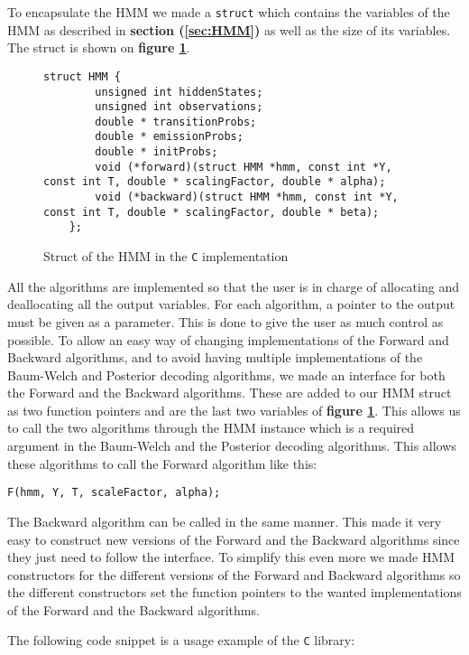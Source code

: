 To encapsulate the HMM we made a \texttt{struct} which contains the variables of the HMM as described in \textbf{section (\ref{sec:HMM})} as well as the size of its variables. The struct is shown on \textbf{figure \ref{fig:hmmstruct}}.
\begin{figure}[H]
    \centering
    \begin{lstlisting}[style=CStyle]
    struct HMM {
        unsigned int hiddenStates;
        unsigned int observations;
        double * transitionProbs;
        double * emissionProbs;
        double * initProbs;
        void (*forward)(struct HMM *hmm, const int *Y, const int T, double * scalingFactor, double * alpha);
        void (*backward)(struct HMM *hmm, const int *Y, const int T, double * scalingFactor, double * beta);
    };\end{lstlisting}
    \caption{Struct of the HMM in the \texttt{C} implementation}
    \label{fig:hmmstruct}
\end{figure}
All the algorithms are implemented so that the user is in charge of allocating and deallocating all the output variables. For each algorithm, a pointer to the output must be given as a parameter. This is done to give the user as much control as possible.
To allow an easy way of changing implementations of the Forward and Backward algorithms, and to avoid having multiple implementations of the Baum-Welch and Posterior decoding algorithms, we made an interface for both the Forward and the Backward algorithms. These are added to our HMM struct as two function pointers and are the last two variables of \textbf{figure \ref{fig:hmmstruct}}. This allows us to call the two algorithms through the HMM instance which is a required argument in the Baum-Welch and the Posterior decoding algorithms. This allows these algorithms to call the Forward algorithm like this:
\begin{lstlisting}[style=CStyle]
F(hmm, Y, T, scaleFactor, alpha);\end{lstlisting}

The Backward algorithm can be called in the same manner. 
This  made it very easy to construct new versions of the Forward and the Backward algorithms since they just need to follow the interface. To simplify this even more we made HMM constructors for the different versions of the Forward and Backward algorithms so the different constructors set the function pointers to the wanted implementations of the Forward and the Backward algorithms.

The following code snippet is a usage example of the \texttt{C} library:

